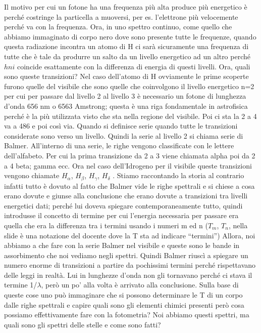 \documentclass[a4paper,11pt]{article}
\begin{document}
\newline Il motivo per cui un fotone ha una frequenza più alta produce più energetico è perché costringe la particella a muoversi, per es. l’elettrone più velocemente perché va con la frequenza. Ora, in uno spettro continuo, come quello che abbiamo immaginato di corpo nero dove sono presente tutte le frequenze, quando questa radiazione incontra un atomo di H ci sarà sicuramente una frequenza di tutte che è tale da produrre un salto da un livello energetico ad un altro perché $hni$ coincide esattamente con la differenza di energia di questi livelli. 
\newline
Ora, quali sono queste transizioni? Nel caso dell’atomo di H ovviamente le prime scoperte furono quelle del visibile che sono quelle che coinvolgono il livello energetico n=2 per cui per passare dal livello 2 al livello 3 è necessario un fotone di lunghezza d’onda 656 nm o 6563 Amstrong; questa è una riga fondamentale in astrofisica perché è la più utilizzata visto che sta nella regione del visibile. Poi ci sta la 2 a 4 va a 486 e poi così via. Quando si definisce serie quando tutte le transizioni considerate sono verso un livello. Quindi la serie al livello 2 si chiama serie di Balmer. All’interno di una serie, le righe vengono classificate con le lettere dell’alfabeto. Per cui la prima transizione da 2 a 3 viene chiamata alpha poi da 2 a 4 beta; gamma ecc.
Ora nel caso dell’Idrogeno per il visibile queste transizioni vengono chiamate $H_\alpha$, $H_\beta$, $H_\gamma$, $H_\delta$ .
\newline
Stiamo raccontando la storia al contrario infatti tutto è dovuto al fatto che Balmer vide le righe spettrali e si chiese a cosa erano dovute e giunse alla conclusione che erano dovute a transizioni tra livelli energetici dati; perché lui doveva spiegare contemporaneamente tutto, quindi introdusse il concetto di termine per cui l’energia necessaria per passare era quella che era la differenza tra i termini usando i numeri m ed n ($T_m $, $T_n $, nella slide è una notazione del docente dove la T sta ad indicare “termini”)
\newline
Allora, noi abbiamo a che fare con la serie Balmer nel visibile e queste sono le bande in assorbimento che noi vediamo negli spettri. Quindi Balmer riuscì a spiegare un numero enorme di transizioni a partire da pochissimi termini perché rispettavano delle leggi in realtà. Lui in lunghezze d’onda non gli tornavano perché ci stava il termine 1/$\lambda$, però un po' alla volta è arrivato alla conclusione. Sulla base di queste cose uno può immaginare che si possono determinare le T di un corpo dalle righe spettrali e capire quali sono gli elementi chimici presenti però cosa possiamo effettivamente fare con la fotometria? Noi abbiamo questi spettri, ma quali sono gli spettri delle stelle e come sono fatti?
\end{document}
